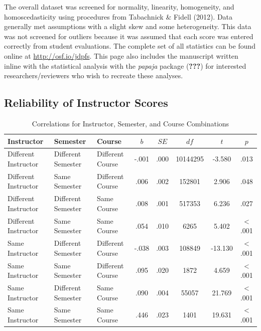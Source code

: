 \documentclass[man]{apa6}
\theoremstyle{definition}
\theoremstyle{definition}
\theoremstyle{definition}
\theoremstyle{remark}
\begin{document}
The overall dataset was screened for normality, linearity, homogeneity,
and homoscedasticity using procedures from Tabachnick \& Fidell (2012).
Data generally met assumptions with a slight skew and some
heterogeneity. This data was not screened for outliers because it was
assumed that each score was entered correctly from student evaluations.
The complete set of all statistics can be found online at
\url{http://osf.io/jdpfs}. This page also includes the manuscript
written inline with the statistical analysis with the \emph{papaja}
package ({\textbf{???}}) for interested researchers/reviewers who wish
to recreate these analyses.

\subsection{Reliability of Instructor
Scores}\label{reliability-of-instructor-scores}

\begin{table}[tbp]
\begin{center}
\begin{threeparttable}
\caption{\label{tab:rel-table}Correlations for Instructor, Semester, and Course Combinations}
\small{
\begin{tabular}{lllccccc}
\toprule
Instructor & Semester & Course & $b$ & $SE$ & $df$ & $t$ & $p$\\
\midrule
Different Instructor & Different Semester & Different Course & -.001 & .000 & 10144295 & -3.580 & .013\\
Different Instructor & Same Semester & Different Course & .006 & .002 & 152801 & 2.906 & .048\\
Different Instructor & Different Semester & Same Course & .008 & .001 & 517353 & 6.236 & .027\\
Different Instructor & Same Semester & Same Course & .054 & .010 & 6265 & 5.402 & < .001\\
Same Instructor & Different Semester & Different Course & -.038 & .003 & 108849 & -13.130 & < .001\\
Same Instructor & Same Semester & Different Course & .095 & .020 & 1872 & 4.659 & < .001\\
Same Instructor & Different Semester & Same Course & .090 & .004 & 55057 & 21.769 & < .001\\
Same Instructor & Same Semester & Same Course & .446 & .023 & 1401 & 19.631 & < .001\\
\bottomrule
\end{tabular}
}
\end{threeparttable}
\end{center}
\end{table}
\end{document}
